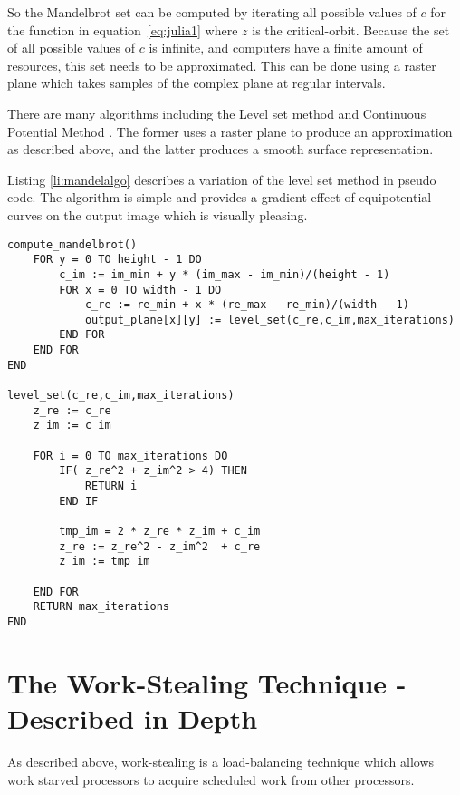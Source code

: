 So the Mandelbrot set can be computed by iterating all possible values of \(c\) for the function in equation~\ref{eq:julia1} where \(z\) is the 
\gls{critical-orbit}. Because the set of all possible values of \(c\) is infinite, and computers have a finite amount of resources, this 
set needs to be approximated. This can be done using a raster plane which takes samples of the complex plane at regular intervals. 

There are many algorithms including the Level set method \cite[p.~188]{fractimg} and Continuous Potential Method \cite[p.~191]{fractimg}.
The former uses a raster plane to produce an approximation as described above, and the latter produces a smooth surface representation.

Listing \ref{li:mandelalgo} describes a variation of the level set method in pseudo code. 
The algorithm is simple and provides a gradient effect of equipotential curves on the output image
which is visually pleasing.

\newpage

\begin{lstlisting}[label = li:mandelalgo, caption = A sequential algorithm to compute the Mandelbrot Set]
compute_mandelbrot()
    FOR y = 0 TO height - 1 DO
        c_im := im_min + y * (im_max - im_min)/(height - 1)
        FOR x = 0 TO width - 1 DO
            c_re := re_min + x * (re_max - re_min)/(width - 1)
            output_plane[x][y] := level_set(c_re,c_im,max_iterations)
        END FOR
    END FOR
END

level_set(c_re,c_im,max_iterations)
    z_re := c_re
    z_im := c_im

    FOR i = 0 TO max_iterations DO
        IF( z_re^2 + z_im^2 > 4) THEN
            RETURN i
        END IF
        
        tmp_im = 2 * z_re * z_im + c_im
        z_re := z_re^2 - z_im^2  + c_re
        z_im := tmp_im
        
    END FOR
    RETURN max_iterations
END
\end{lstlisting}

\section{The Work-Stealing Technique - Described in Depth}
\label{sec:resworkdepth}

As described above, \gls{work-stealing} is a \gls{load-balancing} technique which allows work starved processors to acquire scheduled work from other processors. 

